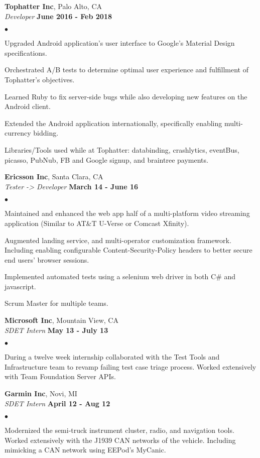 \documentclass[margin,line]{res}
\newenvironment{list2}{
  \begin{list}{$\bullet$}{
      \setlength{\itemsep}{0in}
      \setlength{\parsep}{0in} \setlength{\parskip}{0in}
      \setlength{\topsep}{0in} \setlength{\partopsep}{0in} 
      \setlength{\leftmargin}{0.2in}}}{\end{list}}
\begin{document}
\begin{resume}
  {\bf Tophatter Inc}, Palo Alto, CA\\
  {\em Developer} \hfill {\bf June 2016 - Feb 2018}
\begin{list2}
  \item  Upgraded Android application’s user interface to Google’s Material Design specifications.
  \item  Orchestrated A/B tests to determine optimal user experience and fulfillment of Tophatter’s objectives.
  \item  Learned Ruby to fix server-side bugs while also developing new features on the Android client.
  \item  Extended the Android application internationally, specifically enabling multi-currency bidding.
  \item  Libraries/Tools used while at Tophatter: databinding, crashlytics, eventBus, picasso, PubNub, FB and Google signup, and braintree payments.
\end{list2}

  {\bf Ericsson Inc}, Santa Clara, CA\\
  {\em Tester -> Developer} \hfill {\bf March 14 - June 16}
\begin{list2}
  \item Maintained and enhanced the web app half of a multi-platform video streaming application (Similar to AT\&T U-Verse or Comcast Xfinity).
  \item Augmented landing service, and multi-operator customization framework. Including enabling configurable Content-Security-Policy headers to better secure end users’ browser sessions.
  \item Implemented automated tests using a selenium web driver in both C\# and javascript.
  \item Scrum Master for multiple teams.
\end{list2}

  {\bf Microsoft Inc}, Mountain View, CA\\
  {\em SDET Intern} \hfill {\bf May 13 - July 13}
\begin{list2}
  \item During a twelve week internship collaborated with the Test Tools and Infrastructure team to revamp failing test case triage process. Worked extensively with Team Foundation Server APIs.
\end{list2}

  {\bf Garmin Inc}, Novi, MI\\
  {\em SDET Intern} \hfill {\bf April 12 - Aug 12}
\begin{list2}
  \item Modernized the semi-truck instrument cluster, radio, and navigation tools. Worked extensively with the J1939 CAN networks of the vehicle. Including mimicking a CAN network using EEPod’s MyCanic.
\end{list2}



\end{resume}
\end{document}
